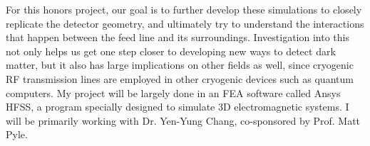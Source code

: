 \documentclass[10pt]{article}
\begin{document}
	For this honors project, our goal is to further develop these simulations to 
	closely replicate the detector geometry, and ultimately try to understand the 
	interactions that happen between the feed line and its surroundings. Investigation 
	into this not only helps us get one step closer to developing new ways to detect
	dark matter, but it also has large implications on other fields as well, since 
	cryogenic RF transmission lines are employed in other cryogenic devices such as quantum 
	computers. 
	My project will be largely done in an FEA software called Ansys HFSS, a program 
	specially designed to simulate 3D electromagnetic systems. I will be primarily 
	working with Dr. Yen-Yung Chang, co-sponsored by Prof. Matt Pyle. 
	
\end{document}
